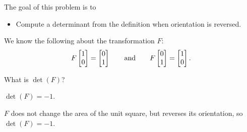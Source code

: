 
	\displayonlynewpage
	\bookonlynewpage
	\question
	\begin{annotation}
		\begin{goals}

			The goal of this problem is to
			\begin{itemize}
				\item Compute a determinant from the definition when orientation is reversed.
			\end{itemize}
		\end{goals}
	\end{annotation}
	We know the following about the transformation $F$:
	\[
		F\mat{1\\0}=\mat{0\\1}\qquad\text{and}\qquad F\mat{0\\1}=\mat{1\\0}.
	\]
	\begin{parts}
		\item What is $\det(F)$?
			\begin{solution}
				$\det(F)=-1$.

				$F$ does not change the area of the unit square, but reverses its
				orientation, so $\det(F)=-1$.
			\end{solution}
	\end{parts}


